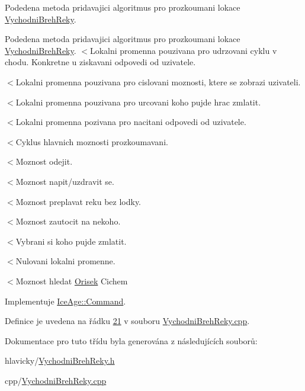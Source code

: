 Podedena metoda pridavajici algoritmus pro prozkoumani lokace \hyperlink{classIceAge_1_1VychodniBrehReky}{Vychodni\+Breh\+Reky}. 

Podedena metoda pridavajici algoritmus pro prozkoumani lokace \hyperlink{classIceAge_1_1VychodniBrehReky}{Vychodni\+Breh\+Reky}. $<$Lokalni promenna pouzivana pro udrzovani cyklu v chodu. Konkretne u ziskavani odpovedi od uzivatele.

$<$Lokalni promenna pouzivana pro cislovani moznosti, ktere se zobrazi uzivateli.

$<$Lokalni promenna pouzivana pro urcovani koho pujde hrac zmlatit.

$<$Lokalni promenna pozivana pro nacitani odpovedi od uzivatele.

$<$Cyklus hlavnich moznosti prozkoumavani.

$<$Moznost odejit.

$<$Moznost napit/uzdravit se.

$<$Moznost preplavat reku bez lodky.

$<$Moznost zautocit na nekoho.

$<$Vybrani si koho pujde zmlatit.

$<$Nulovani lokalni promenne.

$<$Moznost hledat \hyperlink{classIceAge_1_1Orisek}{Orisek} Cichem 

Implementuje \hyperlink{classIceAge_1_1Command_a0466e88c0c9e2a44618c12f6c88b76fe}{Ice\+Age\+::\+Command}.



Definice je uvedena na řádku \hyperlink{VychodniBrehReky_8cpp_source_l00021}{21} v souboru \hyperlink{VychodniBrehReky_8cpp_source}{Vychodni\+Breh\+Reky.\+cpp}.



Dokumentace pro tuto třídu byla generována z následujících souborů\+:\begin{DoxyCompactItemize}
\item 
hlavicky/\hyperlink{VychodniBrehReky_8h}{Vychodni\+Breh\+Reky.\+h}\item 
cpp/\hyperlink{VychodniBrehReky_8cpp}{Vychodni\+Breh\+Reky.\+cpp}\end{DoxyCompactItemize}
